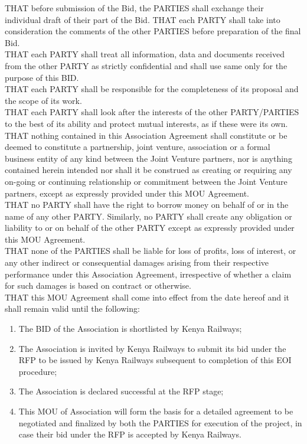 THAT  before submission of the Bid, the PARTIES  shall exchange their individual draft of their part of the Bid. THAT each PARTY shall take into consideration the comments of the other PARTIES before preparation of the final Bid.\\

THAT each PARTY shall treat all information, data and documents received from the other PARTY as strictly confidential and shall use same only for the purpose of this BID. \\

THAT each PARTY shall be responsible for the completeness of its proposal and the scope of its work.\\

THAT each PARTY shall look after the interests of the other PARTY/PARTIES to the best of its ability and protect mutual interests, as if these were its own.\\

THAT nothing contained in this Association Agreement shall constitute or be deemed to constitute a partnership, joint venture, association or a formal business entity of any kind between the Joint Venture partners, nor is anything contained herein intended nor shall it be construed as creating or requiring any on-going or continuing relationship or commitment between the Joint Venture partners, except as expressly provided under this MOU Agreement.\\

THAT no PARTY shall have the right to borrow money on behalf of or in the name of any other PARTY. Similarly, no PARTY shall create any obligation or liability to or on behalf of the other PARTY except as expressly provided under this MOU Agreement.\\

THAT none of the PARTIES shall be liable for loss of profits, loss of interest, or any other indirect or consequential damages arising from their respective performance under this Association Agreement, irrespective of whether a claim for such damages is based on contract or otherwise.\\

THAT this MOU Agreement shall come into effect from the date hereof and it shall remain valid until the following:\\
\begin{enumerate}
	\begin{enumerate}
		\item The BID of the Association is shortlisted by Kenya Railways;
		\item    The Association is invited by Kenya Railways to submit its bid under the RFP to be   issued by Kenya Railways subsequent to completion of this EOI procedure;
		\item The  Association is declared successful at the RFP stage;
		\item This MOU of Association will form the basis for a detailed agreement to be negotiated and finalized by both the PARTIES for execution of the project, in case their bid under the RFP is accepted by Kenya Railways.
	\end{enumerate}
\end{enumerate}

